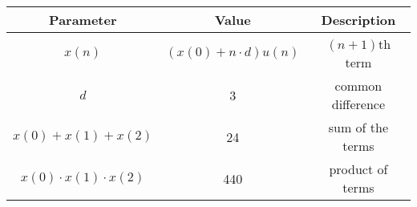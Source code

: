 \begin{tabular}{|c|c|c|}
    \hline
    \textbf{Parameter} & \textbf{Value} & \textbf{Description} \\
    \hline
    $x(n)$  & $\left(x(0) + n \cdot d\right) u(n)$ & $(n+1)$th term \\ 
    \hline
    $d$  & 3 & common difference \\ 
    \hline
    $x(0)+x(1)+x(2)$  & 24 & sum of the terms \\
    \hline
    $x(0)\cdot x(1)\cdot x(2)$  & 440 & product of terms \\
    \hline
\end{tabular}



